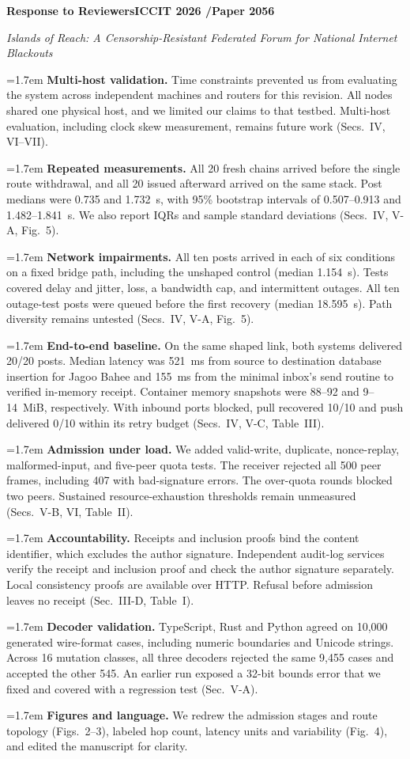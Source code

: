 \documentclass[10pt,a4paper]{article}
\newcommand{\reviewer}[1]{\par\vspace{7pt}{\large\bfseries Reviewer #1}\par\vspace{1pt}}
\newcommand{\reply}[3]{\par\vspace{2pt}\begingroup\hangindent=1.7em\hangafter=1
  \makebox[1.7em][l]{\textbf{#1.}}\textbf{#2.} #3\par\endgroup}
\begin{document}
\raggedright\frenchspacing
{\Large\bfseries Response to Reviewers}\hfill {\bfseries ICCIT 2026 \enspace/\enspace Paper 2056}\par
\vspace{3pt}
\textit{Islands of Reach: A Censorship-Resistant Federated Forum for National Internet Blackouts}\par

\reviewer{1}
\reply{1}{Multi-host validation}{Time constraints prevented us from evaluating the system across independent machines and routers for this revision. All nodes shared one physical host, and we limited our claims to that testbed. Multi-host evaluation, including clock skew measurement, remains future work (Secs.~IV, VI--VII).}
\reply{2}{Repeated measurements}{All 20 fresh chains arrived before the single route withdrawal, and all 20 issued afterward arrived on the same stack. Post medians were 0.735 and 1.732~s, with 95\% bootstrap intervals of 0.507--0.913 and 1.482--1.841~s. We also report IQRs and sample standard deviations (Secs.~IV, V-A, Fig.~5).}
\reply{3}{Network impairments}{All ten posts arrived in each of six conditions on a fixed bridge path, including the unshaped control (median 1.154~s). Tests covered delay and jitter, loss, a bandwidth cap, and intermittent outages. All ten outage-test posts were queued before the first recovery (median 18.595~s). Path diversity remains untested (Secs.~IV, V-A, Fig.~5).}
\reply{4}{End-to-end baseline}{On the same shaped link, both systems delivered 20/20 posts. Median latency was 521~ms from source to destination database insertion for Jagoo Bahee and 155~ms from the minimal inbox's send routine to verified in-memory receipt. Container memory snapshots were 88--92 and 9--14~MiB, respectively. With inbound ports blocked, pull recovered 10/10 and push delivered 0/10 within its retry budget (Secs.~IV, V-C, Table~III).}
\reply{5}{Admission under load}{We added valid-write, duplicate, nonce-replay, malformed-input, and five-peer quota tests. The receiver rejected all 500 peer frames, including 407 with bad-signature errors. The over-quota rounds blocked two peers. Sustained resource-exhaustion thresholds remain unmeasured (Secs.~V-B, VI, Table~II).}
\reply{6}{Accountability}{Receipts and inclusion proofs bind the content identifier, which excludes the author signature. Independent audit-log services verify the receipt and inclusion proof and check the author signature separately. Local consistency proofs are available over HTTP. Refusal before admission leaves no receipt (Sec.~III-D, Table~I).}
\reply{7}{Decoder validation}{TypeScript, Rust and Python agreed on 10,000 generated wire-format cases, including numeric boundaries and Unicode strings. Across 16 mutation classes, all three decoders rejected the same 9,455 cases and accepted the other 545. An earlier run exposed a 32-bit bounds error that we fixed and covered with a regression test (Sec.~V-A).}
\reply{8}{Figures and language}{We redrew the admission stages and route topology (Figs.~2--3), labeled hop count, latency units and variability (Fig.~4), and edited the manuscript for clarity.}
\end{document}

